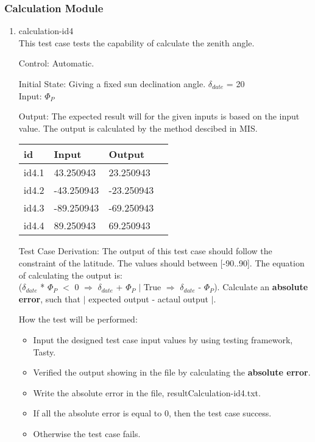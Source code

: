 \documentclass[12pt, titlepage]{article}
\begin{document}
\subsubsection{Calculation Module} 

\begin{enumerate}
\item{calculation-id4\\} 
This test case tests the capability of calculate the zenith angle.

Control: Automatic. 

Initial State: Giving a fixed sun declination angle. $\delta_{date}$ =  20\\
Input: $\Phi_P$ 


Output: The expected result will for the given inputs is based on the input value.
The output is calculated by the method descibed in MIS. 

\noindent \begin{tabular}{l l l l} 
    \toprule		
    \textbf{id} & \textbf{Input} & \textbf{Output}\\ 
	\midrule
   id4.1 &  43.250943  & 23.250943\\
   id4.2 & -43.250943  & -23.250943\\
   id4.3 & -89.250943  & -69.250943\\
   id4.4 &  89.250943  & 69.250943\\
    \bottomrule
  \end{tabular}

Test Case Derivation: The output of this test case should follow the constraint of the latitude. The values should between [-90..90]. The equation of calculating the output is:\\
($\delta_{date}$ * $\Phi_P$  $<$ 0 $\Rightarrow$ $\delta_{date}$ + $\Phi_P$ $|$ True $\Rightarrow$ $\delta_{date}$ - $\Phi_P$). Calculate an \textbf{absolute error}, such that $|$ expected output - actaul output $|$.


How the test will be performed:

\begin{itemize} 
\item Input the designed test case input values by using testing framework, Tasty. 
\item Verified the output showing in the file by calculating the \textbf{absolute error}.
\item Write the absolute error in the file, resultCalculation-id4.txt.
\item If all the absolute error is equal to 0, then the test case success.
\item Otherwise the test case fails.
\end{itemize}


\end{enumerate}
\end{document}
